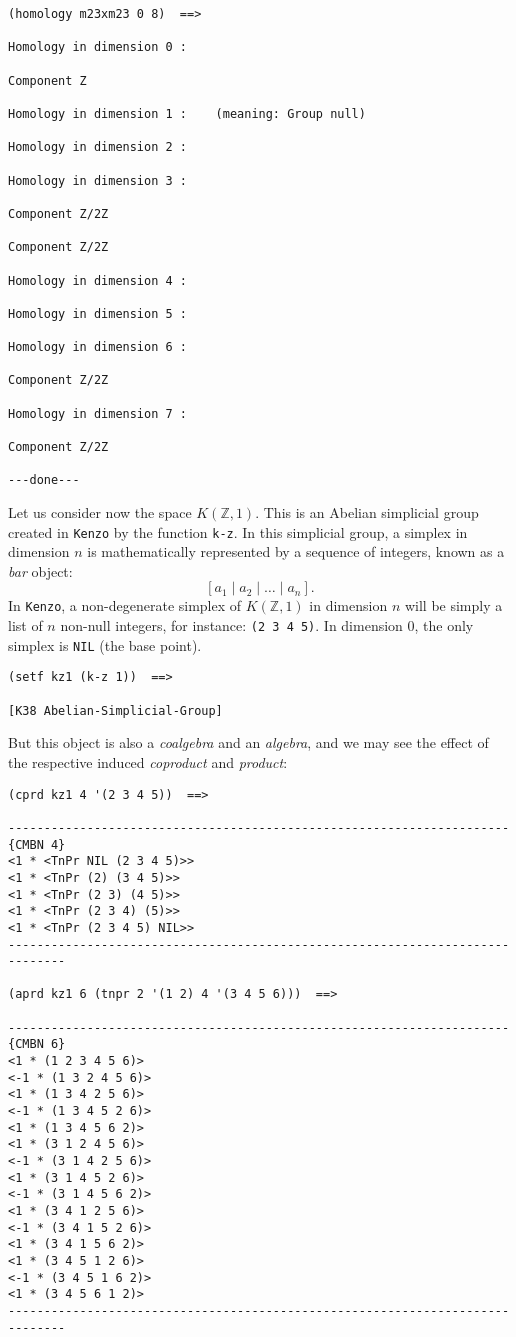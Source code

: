 {\footnotesize\begin{verbatim}
(homology m23xm23 0 8)  ==>

Homology in dimension 0 :

Component Z

Homology in dimension 1 :    (meaning: Group null)

Homology in dimension 2 :

Homology in dimension 3 :

Component Z/2Z

Component Z/2Z

Homology in dimension 4 :

Homology in dimension 5 :

Homology in dimension 6 :

Component Z/2Z

Homology in dimension 7 :

Component Z/2Z

---done---
\end{verbatim}}
\newpage
Let us consider now the space $K(\mathbb{Z}, 1)$. This is an Abelian simplicial group created  in {\tt Kenzo} 
by the function {\tt k-z}.
In this simplicial group, a  simplex  in dimension $n$ 
is mathematically represented by a sequence of integers, known as a {\em bar} object:
$$ [a_1 \mid a_2 \mid \ldots \mid a_n]. $$
In {\tt Kenzo}, a non-degenerate simplex of $K(\mathbb{Z},1)$ in dimension $n$ will be simply 
a list of $n$ non-null integers, for instance: {\tt (2 3 4 5)}. In dimension $0$, the only
simplex is {\tt NIL} (the base point).
{\footnotesize\begin{verbatim}
(setf kz1 (k-z 1))  ==>

[K38 Abelian-Simplicial-Group]
\end{verbatim}}
But this object is also a {\em coalgebra} and an {\em algebra}, and we may
see the effect of the respective induced {\em coproduct} and {\em product}:
{\footnotesize\begin{verbatim}
(cprd kz1 4 '(2 3 4 5))  ==>

----------------------------------------------------------------------{CMBN 4}
<1 * <TnPr NIL (2 3 4 5)>>
<1 * <TnPr (2) (3 4 5)>>
<1 * <TnPr (2 3) (4 5)>>
<1 * <TnPr (2 3 4) (5)>>
<1 * <TnPr (2 3 4 5) NIL>>
------------------------------------------------------------------------------

(aprd kz1 6 (tnpr 2 '(1 2) 4 '(3 4 5 6)))  ==>

----------------------------------------------------------------------{CMBN 6}
<1 * (1 2 3 4 5 6)>
<-1 * (1 3 2 4 5 6)>
<1 * (1 3 4 2 5 6)>
<-1 * (1 3 4 5 2 6)>
<1 * (1 3 4 5 6 2)>
<1 * (3 1 2 4 5 6)>
<-1 * (3 1 4 2 5 6)>
<1 * (3 1 4 5 2 6)>
<-1 * (3 1 4 5 6 2)>
<1 * (3 4 1 2 5 6)>
<-1 * (3 4 1 5 2 6)>
<1 * (3 4 1 5 6 2)>
<1 * (3 4 5 1 2 6)>
<-1 * (3 4 5 1 6 2)>
<1 * (3 4 5 6 1 2)>
------------------------------------------------------------------------------
\end{verbatim}}
